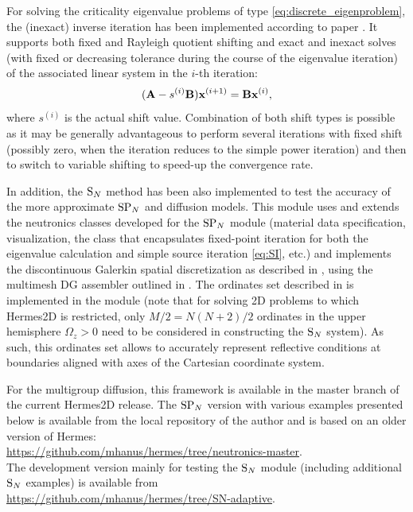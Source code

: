 For solving the criticality eigenvalue problems of type \eqref{eq:discrete_eigenproblem}, the (inexact) inverse
iteration has been implemented according to paper \cite{Freitag}. It supports  both fixed and Rayleigh quotient shifting
and exact and inexact solves (with fixed or decreasing tolerance during the course of the eigenvalue iteration) of the
associated linear system in the $i$-th iteration:
$$
	(\mathbf{A} - s^{(i)}\mathbf{B})\mathbf{x}^{(i+1)} = \mathbf{B}\mathbf{x}^{(i)}, 
$$
where $s^{(i)}$ is the actual shift value. Combination of both shift types is possible as it may be generally
advantageous to perform several iterations with fixed shift (possibly zero, when the iteration reduces to the simple 
power iteration) and then to switch to variable shifting to speed-up the convergence rate.

In addition, the $\text{S}_{N}$ method has been also implemented to test the accuracy of the more approximate $\text{SP}_{N}$ and
diffusion models. This module uses and extends the neutronics classes developed for the $\text{SP}_{N}$ module (material
data specification, visualization, the class that encapsulates fixed-point iteration for both the
eigenvalue calculation and simple source iteration \eqref{eq:SI}, etc.) and implements the discontinuous Galerkin
spatial discretization as described in , using the multimesh DG assembler outlined in
. The ordinates set described in  is implemented in the module (note that for
solving 2D problems to which Hermes2D is restricted, only $M/2 = N(N + 2) / 2$ ordinates in the upper hemisphere
$\Omega_z > 0$ need to be considered in constructing the $\text{S}_{N}$ system). As such, this ordinates set allows to accurately
represent reflective conditions at boundaries aligned with axes of the Cartesian coordinate system.

For the multigroup diffusion, this framework is available in the master branch of the current Hermes2D release.
The $\text{SP}_{N}$ version with various examples presented below is available from the local repository of the author and is 
based on an older version of Hermes:\\
\url{https://github.com/mhanus/hermes/tree/neutronics-master}.\\
The development version
mainly for testing the $\text{S}_{N}$ module (including additional $\text{S}_{N}$ examples) is available from\\
\url{https://github.com/mhanus/hermes/tree/SN-adaptive}.

